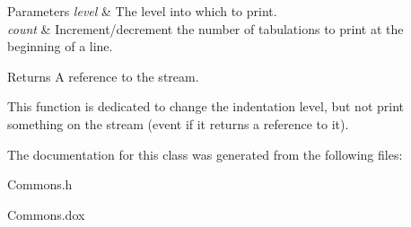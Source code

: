 \begin{DoxyParams}{Parameters}
{\em level} & The level into which to print. \\
\hline
{\em count} & Increment/decrement the number of tabulations to print at the beginning of a line. \\
\hline
\end{DoxyParams}
\begin{DoxyReturn}{Returns}
A reference to the stream.
\end{DoxyReturn}
This function is dedicated to change the indentation level, but not print something on the stream (event if it returns a reference to it). 

The documentation for this class was generated from the following files\+:\begin{DoxyCompactItemize}
\item 
Commons.\+h\item 
Commons.\+dox\end{DoxyCompactItemize}
